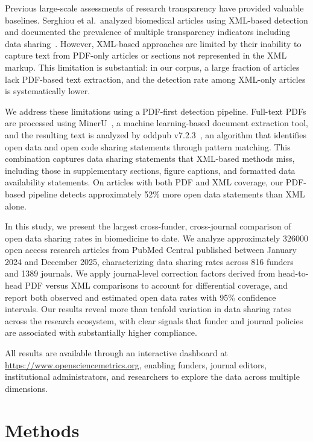 Previous large-scale assessments of research transparency have provided valuable baselines. Serghiou et al.\ analyzed biomedical articles using XML-based detection and documented the prevalence of multiple transparency indicators including data sharing~\cite{Serghiou2021-pl}. However, XML-based approaches are limited by their inability to capture text from PDF-only articles or sections not represented in the XML markup. This limitation is substantial: in our corpus, a large fraction of articles lack PDF-based text extraction, and the detection rate among XML-only articles is systematically lower.

We address these limitations using a PDF-first detection pipeline. Full-text PDFs are processed using MinerU~\cite{Wang2024mineru}, a machine learning-based document extraction tool, and the resulting text is analyzed by oddpub v7.2.3~\cite{Riedel2020-fk}, an algorithm that identifies open data and open code sharing statements through pattern matching. This combination captures data sharing statements that XML-based methods miss, including those in supplementary sections, figure captions, and formatted data availability statements. On articles with both PDF and XML coverage, our PDF-based pipeline detects approximately 52\% more open data statements than XML alone.

In this study, we present the largest cross-funder, cross-journal comparison of open data sharing rates in biomedicine to date. We analyze approximately \num{326000} open access research articles from PubMed Central published between January 2024 and December 2025, characterizing data sharing rates across 816 funders and \num{1389} journals. We apply journal-level correction factors derived from head-to-head PDF versus XML comparisons to account for differential coverage, and report both observed and estimated open data rates with 95\% confidence intervals. Our results reveal more than tenfold variation in data sharing rates across the research ecosystem, with clear signals that funder and journal policies are associated with substantially higher compliance.

All results are available through an interactive dashboard at \url{https://www.opensciencemetrics.org}, enabling funders, journal editors, institutional administrators, and researchers to explore the data across multiple dimensions.


\section{Methods}

